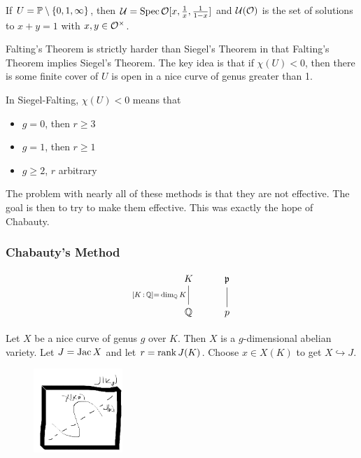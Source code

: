 \begin{ex}
If $U= \P \setminus \{0,1,\infty\}$, then $\cU= \spec \O[x, \frac{1}{x},\frac{1}{1-x}]$ and $\cU(\O)$ is the set of solutions to $x+y=1$ with $x,y \in \O^\times$. 
\end{ex}


\begin{rem}
Falting's Theorem is strictly harder than Siegel's Theorem in that Falting's Theorem implies Siegel's Theorem. The key idea is that if $\chi(U)<0$, then there is some finite \etale cover of $U$ is open in a nice curve of genus greater than 1.  
\end{rem}


In Siegel-Falting, $\chi(U)<0$ means that 


\begin{itemize}
\item $g=0$, then $r \geq 3$
\item $g=1$, then $r \geq 1$
\item $g \geq 2$, $r$ arbitrary 
\end{itemize}


The problem with nearly all of these methods is that they are not effective. The goal is then to try to make them effective. This was exactly the hope of Chabauty. 



\subsubsection{Chabauty's Method}

	\[
	\begin{tikzcd}
	K \arrow[dash,swap]{d}{[K\,:\,\Q]=\,\dim_\Q K} & \p \arrow[dash]{d} \\
	\Q & p 
	\end{tikzcd}
	\]

Let $X$ be a nice curve of genus $g$ over $K$. Then $X$ is a $g$-dimensional abelian variety. Let $J= \jac  X$ and let $r= \rank J(K)$. Choose $x \in X(K)$ to get $X \hookrightarrow J$. 

	\begin{figure}[!ht]
	\centering 
	\includegraphics[width=0.3\textwidth]{../images/im1.png}
	\end{figure}
	
